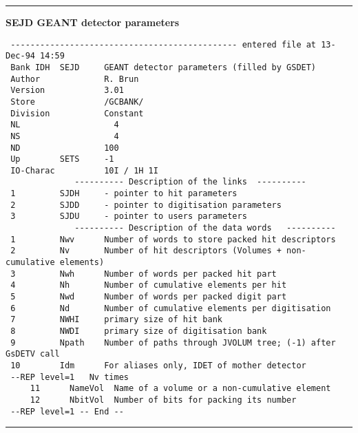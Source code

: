 \rule{15cm}{.05cm}   
             
{\large \bf \sf SEJD GEANT detector parameters }
\begin{verbatim}
 ---------------------------------------------- entered file at 13-Dec-94 14:59
 Bank IDH  SEJD     GEANT detector parameters (filled by GSDET)                           
 Author             R. Brun                                                     
 Version            3.01                                                        
 Store              /GCBANK/ 
 Division           Constant 
 NL                   4                                                             
 NS                   4                                                             
 ND                 100                                                             
 Up        SETS     -1                                                          
 IO-Charac          10I / 1H 1I                                                 
              ---------- Description of the links  ----------
 1         SJDH     - pointer to hit parameters                                 
 2         SJDD     - pointer to digitisation parameters                        
 3         SJDU     - pointer to users parameters                               
              ---------- Description of the data words   ----------
 1         Nwv      Number of words to store packed hit descriptors               
 2         Nv       Number of hit descriptors (Volumes + non-cumulative elements)
 3         Nwh      Number of words per packed hit part                         
 4         Nh       Number of cumulative elements per hit  
 5         Nwd      Number of words per packed digit part                       
 6         Nd       Number of cumulative elements per digitisation  
 7         NWHI     primary size of hit bank                                    
 8         NWDI     primary size of digitisation bank                           
 9         Npath    Number of paths through JVOLUM tree; (-1) after GsDETV call                    
 10        Idm      For aliases only, IDET of mother detector                   
 --REP level=1   Nv times                                                        
     11      NameVol  Name of a volume or a non-cumulative element
     12      NbitVol  Number of bits for packing its number                     
 --REP level=1 -- End --                                                        
\end{verbatim}

\newpage
\rule{15cm}{.05cm} 

